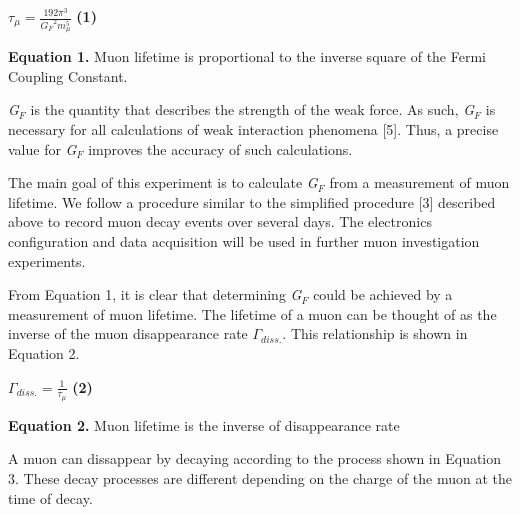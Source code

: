 \documentclass{article}
\begin{document}
\begin{center}
    
    $\tau_{\mu} = \frac{192 \pi^3}{\textit{G$_{F}$}^2 m_{\mu}^5}$ \hspace{10mm} \textbf{(1)}
    
    \vspace{5mm}
    
    \textbf{Equation 1.} Muon lifetime is proportional to the inverse square of the Fermi Coupling Constant.
    
\end{center}


\textit{G$_{F}$} is the quantity that describes the strength of the weak force. As such, \textit{G$_{F}$} is necessary for all calculations of weak interaction phenomena [5]. %
Thus, a precise value for \textit{G$_{F}$} improves the accuracy of such calculations.

The main goal of this experiment is to calculate \textit{G$_{F}$} from a measurement of muon lifetime. We follow a procedure similar to the simplified procedure [3] %
described above to record muon decay events over several days. The electronics configuration and data acquisition will be used in further muon investigation experiments. 

From Equation 1, it is clear that determining \textit{G$_{F}$} could be achieved by a measurement of muon lifetime. The lifetime of a muon can be thought of as the inverse of the muon disappearance rate $\Gamma_{diss.}$. This relationship is shown in Equation 2. 

\begin{center}

    $\Gamma_{diss.} = \frac{1}{\tau_{\mu}}$ \hspace{10mm} \textbf{(2)}
    
    \vspace{5mm}
    
    \textbf{Equation 2.} Muon lifetime is the inverse of disappearance rate
    
\end{center}

A muon can dissappear by decaying according to the process shown in Equation 3. These decay processes are different depending on the charge of the muon at the time of decay. 
\end{document}
